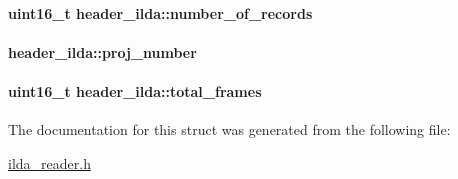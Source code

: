 \paragraph[{\texorpdfstring{number\+\_\+of\+\_\+records}{number_of_records}}]{\setlength{\rightskip}{0pt plus 5cm}uint16\+\_\+t header\+\_\+ilda\+::number\+\_\+of\+\_\+records}\hypertarget{structheader__ilda_a95729a0fc0b7cee4780df158f79e991a}{}\label{structheader__ilda_a95729a0fc0b7cee4780df158f79e991a}
\paragraph[{\texorpdfstring{proj\+\_\+number}{proj_number}}]{ header\+\_\+ilda\+::proj\+\_\+number}\hypertarget{structheader__ilda_ae3658833789ef3584a0c059680426d00}{}\label{structheader__ilda_ae3658833789ef3584a0c059680426d00}
\paragraph[{\texorpdfstring{total\+\_\+frames}{total_frames}}]{\setlength{\rightskip}{0pt plus 5cm}uint16\+\_\+t header\+\_\+ilda\+::total\+\_\+frames}\hypertarget{structheader__ilda_abdbd29a4c96f05535a9bd17e501089d1}{}\label{structheader__ilda_abdbd29a4c96f05535a9bd17e501089d1}


The documentation for this struct was generated from the following file\+:\begin{DoxyCompactItemize}
\item 
\hyperlink{ilda__reader_8h}{ilda\+\_\+reader.\+h}\end{DoxyCompactItemize}
